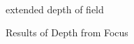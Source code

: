 \documentclass[12pt,a4paper,oneside,openright]{book}
\begin{document}
\begin{CJK}{UTF8}{}
\begin{figure}[htbp]
\begin{center}
\begin{minipage}[c]{.46\textwidth}
    \end{minipage}
    \begin{minipage}[c]{.46\textwidth}
      \begin{center}
        \\
        extended depth of field
      \end{center}
    \end{minipage}
    \caption{Results of Depth from Focus\label{fig:dff}}
  \end{center}
\end{figure}


\end{CJK}
\end{document}
